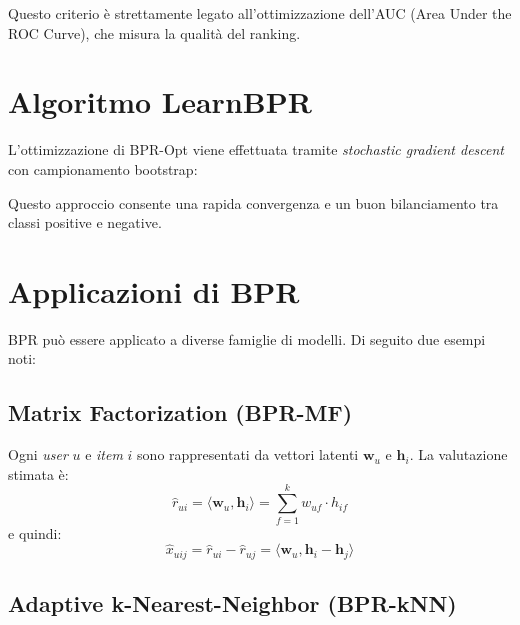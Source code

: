 \documentclass{article}
\begin{document}
Questo criterio è strettamente legato all'ottimizzazione dell'AUC (Area Under the ROC Curve), che misura la qualità del ranking.

\section{Algoritmo LearnBPR}

L'ottimizzazione di BPR-Opt viene effettuata tramite \textit{stochastic gradient descent} con campionamento bootstrap:


Questo approccio consente una rapida convergenza e un buon bilanciamento tra classi positive e negative.

\section{Applicazioni di BPR}

BPR può essere applicato a diverse famiglie di modelli. Di seguito due esempi noti:

\subsection{Matrix Factorization (BPR-MF)}

Ogni \textit{user} $u$ e \textit{item} $i$ sono rappresentati da vettori latenti $\mathbf{w}_u$ e $\mathbf{h}_i$. La valutazione stimata è:
\[
\hat{r}_{ui} = \langle \mathbf{w}_u, \mathbf{h}_i \rangle = \sum_{f=1}^k w_{uf} \cdot h_{if}
\]
e quindi:
\[
\hat{x}_{uij} = \hat{r}_{ui} - \hat{r}_{uj} = \langle \mathbf{w}_u, \mathbf{h}_i - \mathbf{h}_j \rangle
\]

\subsection{Adaptive k-Nearest-Neighbor (BPR-kNN)}
\end{document}
